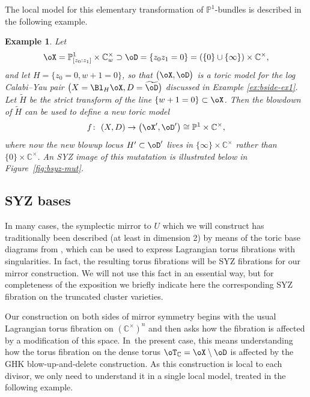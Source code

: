 \documentclass[10pt,a4paper]{amsart}
\numberwithin{equation}{section}
\newtheorem{Example}[Theorem]{Example}
\def\CC{\mathbb{C}}
\def\PP{\mathbb{P}}
\begin{document}
The local model for this elementary transformation of $\PP^1$-bundles is described in the following example.
\begin{Example}\label{ex:elem-mut} Let
\[\oX = \PP^1_{[z_0:z_1]}\times \CC^\times_w\supset\oD = \{z_0z_1=0\}= (\{0\}\cup\{\infty\})\times \CC^\times,\]
and let $H = \{z_0=0, w + 1=0\}$, so that $\bigl(\oX,\oD\bigr)$ is a toric model for the log Calabi--Yau pair $\bigl(X = \Bl_H\oX, D=\widetilde{\oD}\bigr)$ discussed in Example \ref{ex:bside-ex1}. Let $\widetilde{H}$ be the strict transform of the line $\{w+1=0\}\subset \oX$. Then the blowdown of $\widetilde{H}$ can be used to define a new toric model
\[
f\colon\ (X,D)\to\big(\oX',\oD'\big)\cong \PP^1\times \CC^\times,
\]
where now the new blowup locus $H'\subset \oD'$ lives in $\{\infty\}\times \CC^\times$ rather than $\{0\}\times \CC^\times$. An SYZ image of this mutatation is illustrated below in Figure~\ref{fig:bsyz-mut}.
\end{Example}

\subsection{SYZ bases}\label{sec:bsyz}
In many cases, the symplectic mirror to $U$ which we will construct has traditionally been des\-cribed (at least in dimension 2)
by means of the toric base diagrams from \cite{Sym}, which can be used to express Lagrangian torus fibrations with singularities. In fact, the resulting torus fibrations will be SYZ fibrations for our mirror construction. We will not use this fact in an essential way, but for completeness of the exposition we briefly indicate here the corresponding SYZ fibration on the truncated cluster varieties.

Our construction on both sides of mirror symmetry begins with the usual Lagrangian torus fibration on $(\CC^\times)^n$ and then asks how the fibration is affected by a modification of this space. In~the present case, this means understanding how the torus fibration on the dense torus $\oT_\CC=\oX\setminus \oD$ is affected by the GHK blow-up-and-delete construction. As this construction is local to each divisor, we only need to understand it in a single local model, treated in the following example.
\end{document}
